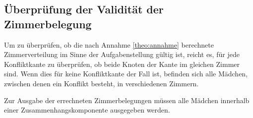 \subsection{Überprüfung der Validität der Zimmerbelegung}
Um zu überprüfen, ob die nach Annahme \ref{theo:annahme} berechnete Zimmerverteilung
im Sinne der Aufgabenstellung gültig ist, reicht es,
für jede Konfliktkante zu überprüfen, ob beide Knoten der Kante im gleichen Zimmer sind.
Wenn dies für keine Konfliktkante der Fall ist, befinden sich alle Mädchen,
zwischen denen ein Konflikt besteht, in verschiedenen Zimmern.

Zur Ausgabe der errechneten Zimmerbelegungen müssen alle Mädchen innerhalb einer
Zusammenhangskomponente ausgegeben werden.
